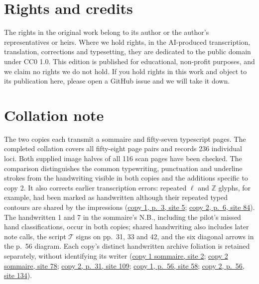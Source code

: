 \documentclass[11pt,a4paper]{article}
\begin{document}
\section*{Rights and credits}
The rights in the original work belong to its author or the author's representatives or heirs. Where we hold rights, in the AI-produced transcription, translation, corrections and typesetting, they are dedicated to the public domain under CC0 1.0. This edition is published for educational, non-profit purposes, and we claim no rights we do not hold. If you hold rights in this work and object to its publication here, please open a GitHub issue and we will take it down.

\clearpage


\section*{Collation note}
The two copies each transmit a sommaire and fifty-seven typescript pages.
The completed collation covers all fifty-eight page pairs and records 236
individual loci. Both supplied image halves of all 116 scan pages have been
checked. The comparison
distinguishes the common typewriting, punctuation and underline strokes from
the handwriting visible in both copies and the additions specific to copy 2.
It also corrects earlier transcription errors: repeated $\ell$ and $\mathbb{Z}$
glyphs, for example, had been marked as handwritten although their repeated
typed contours are shared by the impressions
(\href{https://grothendieck.umontpellier.fr/web/viewer.html?file=../119.pdf\#page=6}{copy 1, p.~3, site 5};
\href{https://grothendieck.umontpellier.fr/web/viewer.html?file=../119.pdf\#page=85}{copy 2, p.~6, site 84}).
The handwritten 1 and 7 in the sommaire's N.B., including the pilot's missed
hand classifications, occur in both copies; shared handwriting also includes
later note calls, the script $\mathcal{T}$ signs on pp.~31, 33 and 42, and the
six diagonal arrows in the p.~56 diagram.
Each copy's distinct handwritten archive foliation is retained separately,
without identifying its writer
(\href{https://grothendieck.umontpellier.fr/web/viewer.html?file=../119.pdf\#page=3}{copy 1 sommaire, site 2};
\href{https://grothendieck.umontpellier.fr/web/viewer.html?file=../119.pdf\#page=79}{copy 2 sommaire, site 78};
\href{https://grothendieck.umontpellier.fr/web/viewer.html?file=../119.pdf\#page=110}{copy 2, p.~31, site 109};
\href{https://grothendieck.umontpellier.fr/web/viewer.html?file=../119.pdf\#page=59}{copy 1, p.~56, site 58};
\href{https://grothendieck.umontpellier.fr/web/viewer.html?file=../119.pdf\#page=135}{copy 2, p.~56, site 134}).
\end{document}
